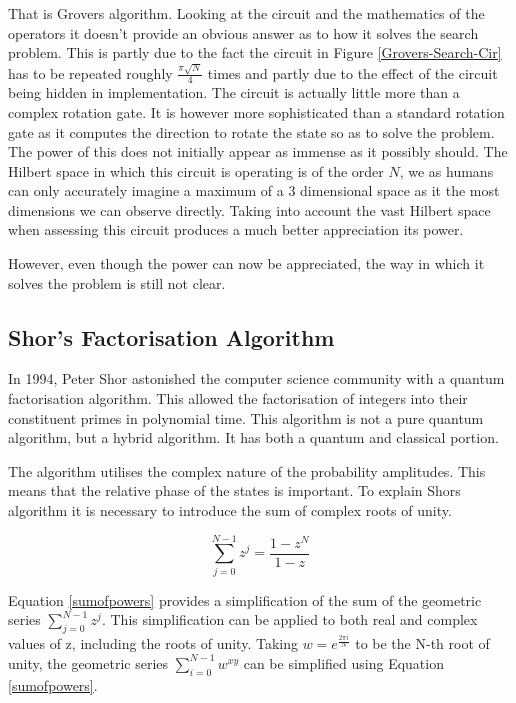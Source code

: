 \documentclass[authoryearcitations]{UoYCSproject}
\begin{document}
That is Grovers algorithm.
Looking at the circuit and the mathematics of the operators it doesn't provide an obvious answer as to how it solves the search problem.
This is partly due to the fact the circuit in Figure \ref{Grovers-Search-Cir} has to be repeated roughly $\frac{\pi\sqrt{N}}{4}$ times and partly due to the effect of the circuit being hidden in implementation.
The circuit is actually little more than a complex rotation gate.
It is however more sophisticated than a standard rotation gate as it computes the direction to rotate the state so as to solve the problem.
The power of this does not initially appear as immense as it possibly should.
The Hilbert space in which this circuit is operating is of the order $N$, we as humans can only accurately imagine a maximum of a $3$ dimensional space as it the most dimensions we can observe directly.
Taking into account the vast Hilbert space when assessing this circuit produces a much better appreciation its power.

However, even though the power can now be appreciated, the way in which it solves the problem is still not clear. 

\subsection{Shor's Factorisation Algorithm}
In 1994, Peter Shor astonished the computer science community with a quantum factorisation algorithm\cite{Shor:1994jg}.
This allowed the factorisation of integers into their constituent primes in polynomial time.
This algorithm is not a pure quantum algorithm, but a hybrid algorithm.
It has both a quantum and classical portion.

The algorithm utilises the complex nature of the probability amplitudes.
This means that the relative phase of the states is important.
To explain Shors algorithm it is necessary to introduce the sum of complex roots of unity.

\begin{equation}
 \sum_{j=0}^{N-1}z^j=\frac{1-z^N}{1-z}
\label{sumofpowers}
\end{equation}

Equation \ref{sumofpowers} provides a simplification of the sum of the geometric series $\sum_{j=0}^{N-1}z^j$.
This simplification can be applied to both real and complex values of z, including the roots of unity.
Taking $w=e^{\frac{2\pi{i}}{N}}$ to be the N-th root of unity, the geometric series $\sum_{i=0}^{N-1}w^{xy}$ can be simplified using Equation \ref{sumofpowers}.
\end{document}
